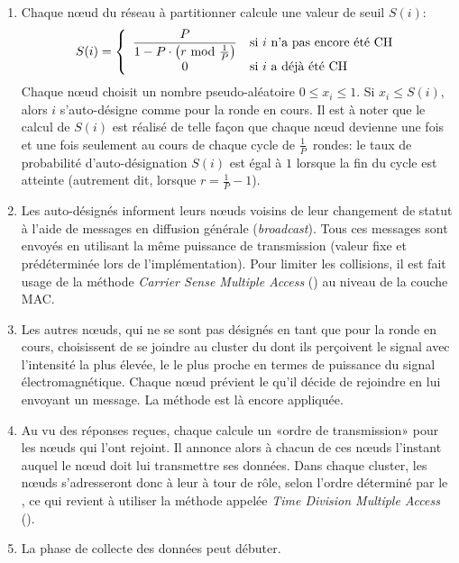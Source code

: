 \begin{enumerate}
    \item Chaque nœud du réseau à partitionner calcule une valeur de seuil $S(i)$:
        \[
            S(i) = \left\{
            \begin{array}{cl}
                \displaystyle \frac{P}{1-P\cdot\left(r\mbox{ mod }\frac{1}{P}\right)} & \mbox{si }i\mbox{ n'a pas encore été \CH}\\
                                                                     0 & \mbox{si }i\mbox{ a déjà été \CH}
            \end{array}
            \right.
        \]
        Chaque nœud choisit un nombre pseudo-aléatoire $0 \le x_{i}\le 1$.
        Si $x_{i} \le S(i)$, alors $i$ s'auto-désigne comme \CH pour la ronde en cours.
        Il est à noter que le calcul de $S(i)$ est réalisé de telle façon que chaque nœud devienne \ch une fois et une fois seulement au cours de chaque cycle de $\frac{1}{P}$~rondes: le taux de probabilité d'auto-désignation $S(i)$ est égal à $1$ lorsque la fin du cycle est atteinte (autrement dit, lorsque $r = \frac{1}{P}-1$).
    \item Les \chs auto-désignés informent leurs nœuds voisins de leur changement de statut à l'aide de messages en diffusion générale (\textit{broadcast}).
        Tous ces messages sont envoyés en utilisant la même puissance de transmission (valeur fixe et prédéterminée lors de l'implémentation).
        Pour limiter les collisions, il est fait usage de la méthode \textit{Carrier Sense Multiple Access} (\csma) au niveau de la couche MAC.
    \item Les autres nœuds, qui ne se sont pas désignés en tant que \chs pour la ronde en cours, choisissent de se joindre au cluster du \CH dont ils perçoivent le signal avec l'intensité la plus élevée, \cad le \CH le plus proche en termes de puissance du signal électromagnétique.
        Chaque nœud prévient le \ch qu'il décide de rejoindre en lui envoyant un message.
        La méthode \csma est là encore appliquée.
    \item Au vu des réponses reçues, chaque \ch calcule un «ordre de transmission» pour les nœuds qui l'ont rejoint.
        Il annonce alors à chacun de ces nœuds l'instant auquel le nœud doit lui transmettre ses données.
        Dans chaque cluster, les nœuds s'adresseront donc à leur \ch à tour de rôle, selon l'ordre déterminé par le \CH, ce qui revient à utiliser la méthode appelée \textit{Time Division Multiple Access} (\tdma).
    \item La phase de collecte des données peut débuter.

\end{enumerate}
